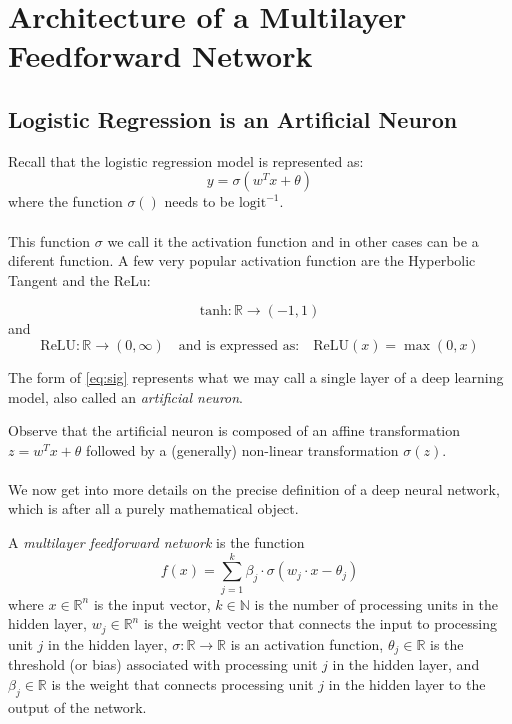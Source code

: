 \documentclass[../main.tex]{subfiles}
\begin{document}
	 
	 \section{Architecture of a Multilayer Feedforward Network}
	 
	 \subsection{Logistic Regression is an Artificial Neuron}
	 \noindent Recall that the logistic regression model is represented as: 
	 \begin{equation}
	 	y=\sigma(w^Tx + \theta) \tag{2}
	 	\label{eq:sig}
	 \end{equation}
	 \noindent where the function $\sigma()$ needs to be $\text{logit}^{-1}$.  \\ \\
	 This function $\sigma$ we call it the activation function and in other cases can be a diferent function. A few very popular activation function are the Hyperbolic Tangent and the ReLu: 
	 
	 
	 \[
	 \text{tanh}: \mathbb{R} \to (-1,1)
	 \]
	 and 
	  \[
	 \text{ReLU}: \mathbb{R} \to (0,\infty)
	 \quad \text{and is expressed as:} \quad
	 \text{ReLU}(x) = \max(0,x)
	 \]
	 
	 The form of \eqref{eq:sig} represents what we may call a single layer of a deep learning model, also called an \textit{artificial neuron}. 
	 
	
	 Observe that the artificial neuron is composed of an affine transformation $ z=w^Tx + \theta$ followed by a (generally) non-linear transformation $\sigma(z)$. \\ \\ 
	 \noindent  We now get into more details on the precise definition of a deep neural network, which is after all a purely mathematical object. 
	 \begin{definition} A \textit{multilayer feedforward network} is the function
	 	$$f(x)=\sum_{j=1}^k \beta_j \cdot \sigma(w_j \cdot x - \theta_j)$$
	 	where $x \in \mathbb{R}^n$ is the input vector, $k \in \mathbb{N}$ is the number of processing units in the hidden layer, $w_j \in \mathbb{R}^n$ is the weight vector that connects the input to processing unit $j$ in the hidden layer, $\sigma : \mathbb{R} \rightarrow \mathbb{R}$ is an activation function, $\theta_j \in \mathbb{R}$ is the threshold (or bias) associated with processing unit $j$ in the hidden layer, and $\beta_j \in \mathbb{R}$ is the weight that connects processing unit $j$ in the hidden layer to the output of the network.
	 	
	 	
	 \end{definition}
	 
\end{document}
